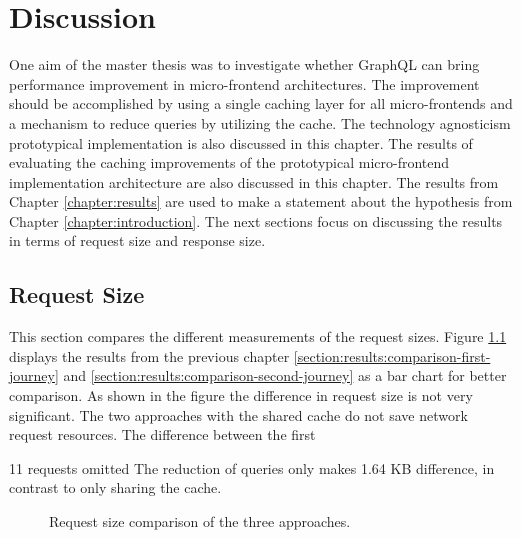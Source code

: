 \chapter{Discussion}\label{chapter:discussion}

One aim of the master thesis was to investigate whether GraphQL can bring performance improvement in micro-frontend architectures. The improvement should be accomplished by using a single caching layer for all micro-frontends and a mechanism to reduce queries by utilizing the cache. The technology agnosticism prototypical implementation is also discussed in this chapter. The results of evaluating the caching improvements of the prototypical micro-frontend implementation architecture are also discussed in this chapter. The results from Chapter \ref{chapter:results} are used to make a statement about the hypothesis from Chapter \ref{chapter:introduction}. The next sections focus on discussing the results in terms of request size and response size. 

\section{Request Size}

This section compares the different measurements of the request sizes. Figure \ref{fig:discussion:request-size} displays the results from the previous chapter \ref{section:results:comparison-first-journey} and \ref{section:results:comparison-second-journey} as a bar chart for better comparison. As shown in the figure the difference in request size is not very significant. The two approaches with the shared cache do not save network request resources. The difference between the first 

11 requests omitted
The reduction of queries only makes 1.64 KB difference, in contrast to only sharing the cache.

\begin{figure}[H]
  \centering
  \caption{Request size comparison of the three approaches.}\label{fig:discussion:request-size}
\end{figure}

